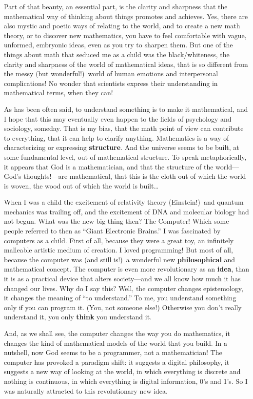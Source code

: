 \documentclass[12pt]{book}
\begin{document}
Part of that beauty, an essential part, is the clarity and sharpness that the mathematical
way of thinking about things promotes and achieves.  Yes, there are also mystic and poetic
ways of relating to the world, and to create a new math theory, or to discover new mathematics,
you have to feel comfortable with vague, unformed, embryonic ideas, even as you try to
sharpen them.  But one of the things about math that seduced me as a child was the black/whiteness,
the clarity and sharpness of the world of mathematical ideas, that is so different from the
messy (but wonderful!)\ world of human emotions and interpersonal complications!
No wonder that scientists express their understanding in mathematical terms, when they can!

As has been often said, to understand something is to make it mathematical, and I hope that
this may eventually even happen to the fields of psychology and sociology, someday.  That is my bias,
that the math point of view can contribute to everything, that it can help to clarify anything.
Mathematics is a way of characterizing or expressing \textbf{structure}.  And the universe
seems to be built, at some fundamental level, out of mathematical structure.  To speak metaphorically,
it appears that God is a mathematician, and that the structure of the world---God's thoughts!---are
mathematical, that this is the cloth out of which the world is woven, the wood out of which the world is built\ldots

When I was a child the excitement of relativity theory (Einstein!)\ 
and quantum mechanics was trailing off,
and the excitement of DNA and molecular biology had not begun.  What was the new big 
thing then? The Computer!  Which some people referred to then as ``Giant Electronic Brains.''
I was fascinated by computers as a child.  First of all, because they were a great toy, an infinitely
malleable artistic medium of creation.  
I loved programming!  But most of all, because the computer was (and still is!)\ a
wonderful new \textbf{philosophical} and mathematical concept.  
The computer is even more revolutionary as an \textbf{idea},
than it is as a practical device that alters society---and we all know 
how much it has changed our lives.  Why do I say this?  Well, the computer changes epistemology,
it changes the meaning of ``to understand.''  To me, you understand something only if you can
program it. (You, not someone else!)  Otherwise you don't really understand it, you only 
\textbf{think} you understand it.

And, as we shall see, the computer changes the way you do mathematics, it changes the kind
of mathematical models of the world that you build.  In a nutshell, now God seems to be a programmer,
not a mathematician! The computer has provoked a paradigm shift: it suggests a digital philosophy,
it suggests a new way of looking at the world,
in which everything is discrete and nothing is continuous,
in which everything is digital information, 0's and 1's.
So I was naturally attracted to this revolutionary new idea.
\end{document}

